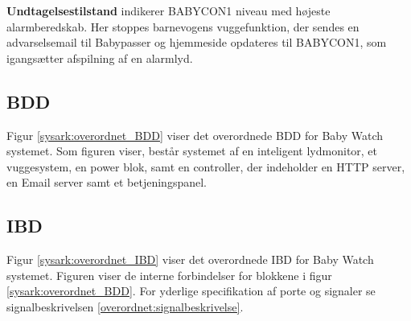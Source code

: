 \textbf{Undtagelsestilstand} indikerer BABYCON1 niveau med højeste alarmberedskab. Her stoppes barnevogens vuggefunktion, der sendes en advarselsemail til Babypasser og hjemmeside opdateres til BABYCON1, som igangsætter afspilning af en alarmlyd. 


\subsection{BDD}
Figur \ref{sysark:overordnet_BDD} viser det overordnede BDD for Baby Watch systemet. Som figuren viser, består systemet af en inteligent lydmonitor, et vuggesystem, en power blok, samt en controller, der indeholder en HTTP server, en Email server samt et betjeningspanel.


\subsection{IBD}

Figur \ref{sysark:overordnet_IBD} viser det overordnede IBD for Baby Watch systemet.  Figuren viser de interne forbindelser for blokkene i figur \ref{sysark:overordnet_BDD}. For yderlige specifikation af porte og signaler se signalbeskrivelsen \ref{overordnet:signalbeskrivelse}.

